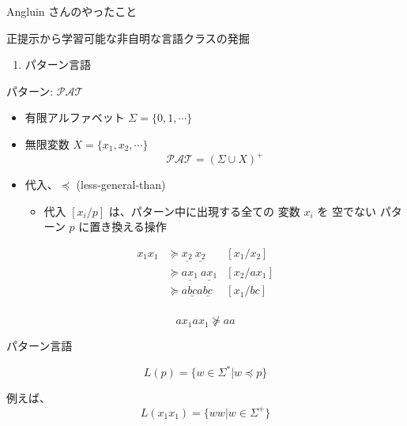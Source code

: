\documentclass[professionalfont, 12pt, dvipdfmx, default, cjk]{beamer}
\begin{document}
\begin{frame}{Angluin さんのやったこと}

正提示から学習可能な非自明な言語クラスの発掘

\begin{enumerate}
\def\labelenumi{\arabic{enumi}.}
\itemsep1pt\parskip0pt
\item
  パターン言語
\end{enumerate}

\end{frame}

\begin{frame}{パターン: \(\mathcal{PAT}\)}

\begin{itemize}
\item
  有限アルファベット \(\Sigma = \{ 0, 1, \cdots \}\)
\item
  無限変数 \(X = \{ x_1, x_2, \cdots \}\)
  \[\mathcal{PAT} = (\Sigma \cup X)^+\]
\item
  代入、\(\preceq\) (less-general-than)

  \begin{itemize}
  \itemsep1pt\parskip0pt
  \item
    代入 \([x_i/p]\) は、パターン中に出現する\alert{全ての} 変数 \(x_i\)
    を \alert{空でない} パターン \(p\) に置き換える操作
  \end{itemize}
\end{itemize}

\vspace*{-6mm}\begin{align*}
x_1 x_1 & \succeq \underline{x_2} ~ \underline{x_2} & [x_1/x_2] \\
& \succeq \underline{a x_1} ~ \underline{a x_1} & [x_2/a x_1] \\
& \succeq a \underline{b c} a \underline{b c} & [x_1/b c] \\
\end{align*}

\vspace*{-10mm}

\[a x_1 a x_1 \not\succeq a a\]

\end{frame}

\begin{frame}{パターン言語}

\[L(p) = \{ w \in \Sigma^* | w \preceq p \}\]

\vfill
例えば、 \[L(x_1 x_1) = \{ w w | w \in \Sigma^+ \}\]

\end{frame}
\end{document}
